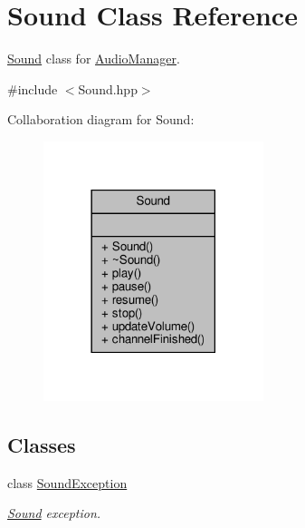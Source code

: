 \hypertarget{class_sound}{}\section{Sound Class Reference}
\label{class_sound}


\hyperlink{class_sound}{Sound} class for \hyperlink{class_audio_manager}{Audio\+Manager}.  




{\ttfamily \#include $<$Sound.\+hpp$>$}



Collaboration diagram for Sound\+:
\nopagebreak
\begin{figure}[H]
\begin{center}
\leavevmode
\includegraphics[width=182pt]{class_sound__coll__graph}
\end{center}
\end{figure}
\subsection*{Classes}
\begin{DoxyCompactItemize}
\item 
class \hyperlink{class_sound_1_1_sound_exception}{Sound\+Exception}
\begin{DoxyCompactList}\small\item\em \hyperlink{class_sound}{Sound} exception. \end{DoxyCompactList}\end{DoxyCompactItemize}
